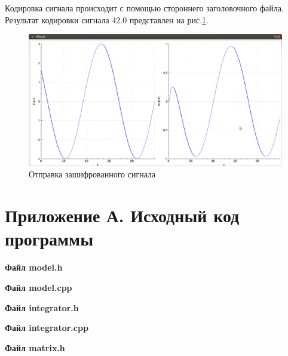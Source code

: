 \documentclass[14pt,a4paper]{extreport}
\begin{document}
Кодировка сигнала происходит с помощью стороннего заголовочного файла. 
Результат кодировки сигнала 42.0 представлен на рис.\ref{fig:cobs}.
\begin{figure}[H]
    \centering
    \includegraphics[width=160mm]{img/100hz.png}
    \caption{Отправка зашифрованного сигнала}
    \label{fig:cobs}
\end{figure}

\newpage
\chapter*{Приложение А. Исходный код программы}

\textbf{Файл model.h}
\begin{alltt}
    
\end{alltt}

\textbf{Файл model.cpp}
\begin{alltt}
    
\end{alltt}

\textbf{Файл integrator.h}
\begin{alltt}
    
\end{alltt}

\textbf{Файл integrator.cpp}
\begin{alltt}
    
\end{alltt}

\textbf{Файл matrix.h}
\begin{alltt}
    
\end{alltt}
\end{document}

